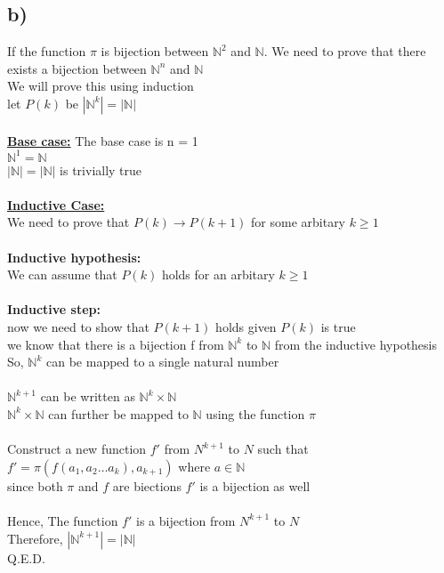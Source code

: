 \documentclass[11pt]{article}
\begin{document}
\subsection*{b)}
If the function $\pi$ is bijection between $\mathbb{N}^2$ and $\mathbb{N}$.
We need to prove that there exists a bijection between $\mathbb{N}^n$ and $\mathbb{N}$ \\
We will prove this using induction \\
let $P(k)$ be $|\mathbb{N}^k| = |\mathbb{N}|$ \\
\\
\textbf{\underline{Base case:}} The base case is n = 1 \\
$\mathbb{N}^1 = \mathbb{N}$ \\
$|\mathbb{N}| = |\mathbb{N}|$ is trivially true \\
\\
\textbf{\underline{Inductive Case:}} \\
We need to prove that $P(k) \rightarrow P(k+1)$ for some arbitary $k \geq 1$ \\
\\
\textbf{Inductive hypothesis:} \\
We can assume that $P(k)$ holds for an arbitary $k \geq 1$ \\
\\
\textbf{Inductive step:} \\
now we need to show that $P(k+1)$ holds given $P(k)$ is true \\
we know that there is a bijection f from $\mathbb{N}^k$ to $\mathbb{N}$ from
the inductive hypothesis \\
So, $\mathbb{N}^k$ can be mapped to a single natural number \\
\\
$\mathbb{N}^{k+1}$ can be written as $\mathbb{N}^k \times \mathbb{N}$ \\
$\mathbb{N}^k \times \mathbb{N}$ can further be mapped to $\mathbb{N}$ using the function $\pi$ \\
\\
Construct a new function $f\prime$ from $N^{k + 1}$ to $N$ such that \\
$f\prime = \pi (f(a_1, a_2 \dots a_k), a_{k+1})$ where $a \in \mathbb{N}$ \\
since both $\pi$ and $f$ are biections $f\prime$ is a bijection as well \\
\\
Hence, The function $f\prime$ is a bijection from $N^{k+1}$ to $N$ \\
Therefore, $|\mathbb{N}^{k+1}| = |\mathbb{N}|$ \\
Q.E.D.
\end{document}
